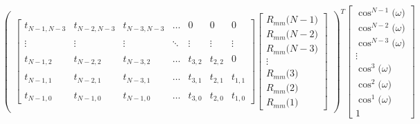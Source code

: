 \documentclass{article}
\begin{document}
\begin{align*}
\begin{pmatrix}
\begin{bmatrix}
                                    t_{N - 1, N - 3} & t_{N - 2, N - 3} & t_{N - 3, N - 3} & \ldots &        0 &        0 &        0 \\ \\
                                              \vdots &           \vdots &           \vdots & \ddots &   \vdots &   \vdots &   \vdots \\ \\
                                    t_{N - 1,     2} & t_{N - 2,     2} & t_{N - 3,     2} & \ldots & t_{3, 2} & t_{2, 2} &        0 \\ \\
                                    t_{N - 1,     1} & t_{N - 2,     1} & t_{N - 3,     1} & \ldots & t_{3, 1} & t_{2, 1} & t_{1, 1} \\ \\
                                    t_{N - 1,     0} & t_{N - 1,     0} & t_{N - 1,     0} & \ldots & t_{3, 0} & t_{2, 0} & t_{1, 0} 
                                  \end{bmatrix}
                                \begin{bmatrix}
                                    R_{mm}\big(N - 1\big) \\
                                    R_{mm}\big(N - 2\big) \\
                                    R_{mm}\big(N - 3\big) \\
                                    \vdots \\
                                    R_{mm}\big(3\big) \\
                                    R_{mm}\big(2\big) \\
                                    R_{mm}\big(1\big)
                                  \end{bmatrix}
                              \end{pmatrix}^{T}
                            \begin{bmatrix}
                                \cos^{N - 1}\big(\omega\big) \\
                                \cos^{N - 2}\big(\omega\big) \\
                                \cos^{N - 3}\big(\omega\big) \\
                                \vdots \\
                                \cos^{3}\big(\omega\big) \\
                                \cos^{2}\big(\omega\big) \\
                                \cos^{1}\big(\omega\big) \\
                                1 
                              \end{bmatrix}
\end{align*}
\end{document}
